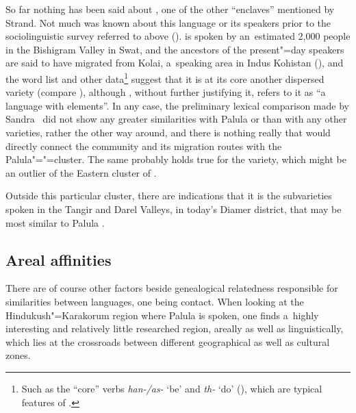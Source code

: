 \largerpage[-1]
So far nothing has been said about \iliUshojo, one of the other ``enclaves'' mentioned by Strand. Not much was known about this language or its speakers prior to the sociolinguistic survey referred to above (\citealt{decker1992}). \iliUshojo is spoken by an~estimated 2,000 people in the Bishigram Valley in Swat, and the ancestors of the present"=day speakers are said to have migrated from Kolai, a~\iliShina speaking area in Indus Kohistan (\citealt[69]{decker1992}), and the word list and other data\footnote{Such as the ``core'' verbs \textit{han-/as-} `be' and \textit{th-} `do' (\citealt[ 71--72, 199--203]{decker1992}), which are typical features of \iliShina.} suggest that it is at its core another dispersed \iliShina variety (compare \citealt[255]{strand2001}), although \citet[9]{zoller2005}, without further justifying it, refers to it as ``a \iliKohistani language with \iliShina elements''. In any case, the preliminary lexical comparison made by Sandra~\citet[70]{decker1992} did not show any greater similarities with Palula or \iliKalkoti than with any other \iliShina varieties, rather the other way around, and there is nothing really that would directly connect the \iliUshojo community and its migration routes with the Palula"=\iliSauji"=\iliKalkoti cluster. The same probably holds true for the \iliKundalShahi variety, which might be an outlier of the Eastern cluster of \iliShina \citep[9]{baartrehman2005}.


Outside this particular cluster, there are indications that it is the \iliShina subvarieties spoken in the Tangir and Darel Valleys, in today's Diamer district, that may be most similar to Palula \citep[142--143]{radloff1992}. 


\subsection{Areal affinities}
\label{subsec:1-3-2}

There are of course other factors beside genealogical relatedness responsible for similarities between languages, one being contact. When looking at the Hindukush"=Karakorum region where Palula is spoken, one finds a~highly interesting and relatively little researched region, areally as well as linguistically, which lies at the crossroads between different geographical as well as cultural zones. 


